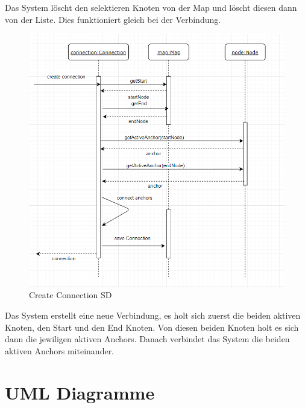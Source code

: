 Das System löscht den selektieren Knoten von der Map und löscht diesen dann von der Liste. 
Dies funktioniert gleich bei der Verbindung.

\begin{figure}[H]
	\centering
		\includegraphics[scale=0.6]{images/connectionSD.PNG}
	\caption{Create Connection SD}
	\label{fig:create_connection_SD}
\end{figure}
Das System erstellt eine neue Verbindung, es holt sich zuerst die beiden aktiven Knoten, den Start 
und den End Knoten. Von diesen beiden Knoten holt es sich dann die jewiligen aktiven Anchors. Danach
verbindet das System die beiden aktiven Anchors miteinander.

\section{UML Diagramme}
\label{sec:uml_diagramme}